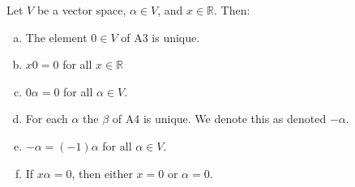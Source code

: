 \documentclass[12pt,letterpaper,reqno]{article}
\numberwithin{equation}{section}
\begin{document}
\begin{thm}\label{thm:properties_of_vector_spaces}
	Let $V$ be a vector space, $\alpha \in V$, and $x \in \mathbb{R}$. Then:
	\begin{enumerate}[(a)]
		\item The element $0 \in V$ of A3 is unique.
		\item $x0=0$ for all $x\in \mathbb{R}$ 
		\item $0\alpha=0$ for all $\alpha \in V$.
		\item For each $\alpha$ the $\beta$ of A4 is unique. We denote this as denoted $-\alpha$.
		\item $-\alpha=(-1)\alpha$ for all $\alpha \in  V$.
		\item If $x\alpha=0$, then either $x=0$ or $\alpha=0$.
	\end{enumerate}
\end{thm}
\end{document}
